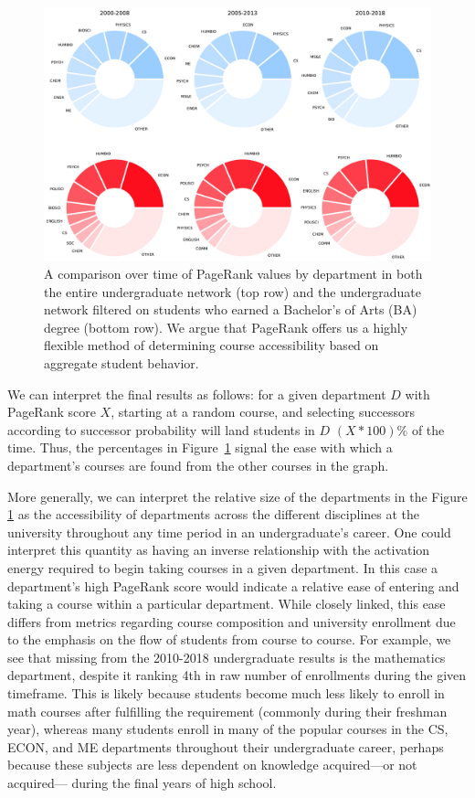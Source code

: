 \documentclass{sigchi}
\begin{document}
\begin{figure}
    \centering
    \includegraphics[width=\columnwidth]{final-evolution.pdf}
    \caption{A comparison over time of PageRank values by department in both the entire undergraduate network (top row) and the undergraduate network filtered on students who earned a Bachelor's of Arts (BA) degree (bottom row). We argue that PageRank offers us a highly flexible method of determining course accessibility based on aggregate student behavior.}
    \label{fig:evolution}
\end{figure}

We can interpret the final results as follows: for a given department
$D$ with PageRank score $X$, starting at a random course, and
selecting successors according to successor probability will land
students in $D$ $(X * 100)$\% of the time. Thus, the percentages in
Figure~\ref{fig:evolution} signal the ease with which a department's
courses are found from the other courses in the graph.

More generally, we can interpret the relative size of the departments
in the Figure \ref{fig:evolution} as the accessibility of departments
across the different disciplines at the university throughout any time
period in an undergraduate's career. One could interpret this quantity
as having an inverse relationship with the activation energy required to
begin taking courses in a given department. In this case a
department's high PageRank score would indicate a relative ease of
entering and taking a course within a particular department. While
closely linked, this ease differs from metrics regarding course
composition and university enrollment due to the emphasis on the flow
of students from course to course. For example, we see that missing
from the 2010-2018 undergraduate results is the mathematics
department, despite it ranking 4th in raw number of enrollments during
the given timeframe. This is likely because students become much less
likely to enroll in math courses after fulfilling the requirement
(commonly during their freshman year), whereas many students enroll in
many of the popular courses in the CS, ECON, and ME departments
throughout their undergraduate career, perhaps because these subjects
are less dependent on knowledge acquired---or not acquired--- during
the final years of high school.
\end{document}
